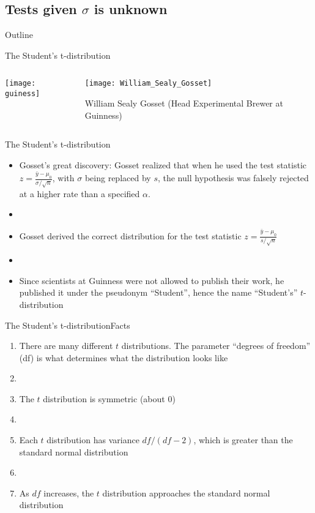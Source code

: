 \documentclass[xcolor=dvipsnames]{beamer}
\begin{document}
\subsection{Tests given $\sigma$ is unknown}
\begin{frame}{Outline}
\tableofcontents[currentsection,subsectionstyle=show/shaded/hide]
\end{frame}

\begin{frame}{The Student's t-distribution}
\begin{columns}
	\begin{column}{.5 \textwidth}
		\texttt{[image: guiness]}
	\end{column}
	\begin{column}{.5 \textwidth}
		\texttt{[image: William\_Sealy\_Gosset]}
		
		William Sealy Gosset (Head Experimental Brewer at Guinness)
	\end{column}
\end{columns}
\end{frame}

\begin{frame}{The Student's t-distribution}
	\begin{itemize}
		\item Gosset's great discovery: Gosset realized that when he used the test statistic $z = \frac{\bar{y}-\mu_0}{\sigma / \sqrt{n}}$, with $\sigma$ being replaced by $s$, the null hypothesis was falsely rejected at a higher rate than a specified $\alpha$. 
		\item[]
		\item Gosset derived the correct distribution for the test statistic $z = \frac{\bar{y}-\mu_0}{s / \sqrt{n}}$
		\item[]
		\item Since scientists at Guinness were not allowed to publish their work, he published it under the pseudonym ``Student'', hence the name ``Student's'' $t$-distribution
	\end{itemize}
\end{frame}

\begin{frame}{The Student's t-distribution}{Facts}
\begin{enumerate}
	\item There are many different $t$ distributions. The parameter ``degrees of freedom'' (df) is what determines what the distribution looks like
	\item[]
	\item The $t$ distribution is symmetric (about 0)
	\item[]
	\item Each $t$ distribution has variance $df / (df - 2)$, which is greater than the standard normal distribution
	\item[]
	\item As $df$ increases, the $t$ distribution approaches the standard normal distribution 
\end{enumerate}	
\end{frame}
\end{document}
